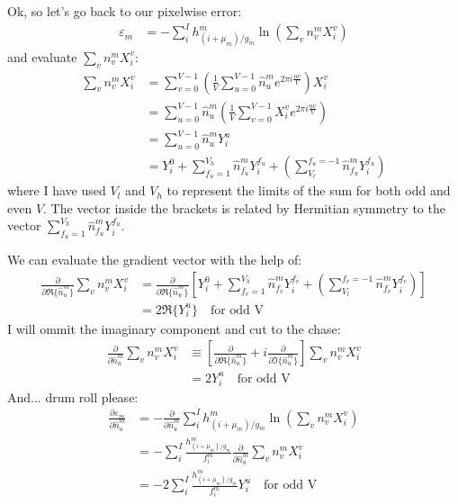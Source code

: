 \documentclass[11pt]{article}
\begin{document}
Ok, so let's go back to our pixelwise error:
\begin{align}
   \varepsilon_m &= - \sum_i^I h^m_{(i+\mu_m)/g_m} \ln\left(\sum_v n^m_v X^v_i\right)
\end{align}
and evaluate $\sum_v n^m_v X^v_i$:
\begin{align}
   \sum_v n^m_v X^v_i &= \sum_{v=0}^{V-1} \left( \frac{1}{V} \sum_{u=0}^{V-1} \hat{n}^m_u e^{2\pi i \frac{u v}{V}} \right) X^v_i \\
   &= \sum_{u=0}^{V-1} \hat{n}^m_u  \left( \frac{1}{V}  \sum_{v=0}^{V-1}  X^v_i e^{2\pi i \frac{u v}{V}}\right) \\
   &= \sum_{u=0}^{V-1} \hat{n}^m_u  Y^u_i \\
   &= Y^0_i + \sum_{f_u=1}^{V_h} \hat{n}^m_{f_u} Y^{f_u}_i + \left(\sum_{V_l}^{f_u=-1} \hat{n}^m_{f_u} Y^{f_u}_i\right) 
\end{align}
where I have used $V_l$ and $V_h$ to represent the limits of the sum for both odd and even $V$. The vector inside the brackets is related by Hermitian symmetry to the vector $\sum_{f_u=1}^{V_h} \hat{n}^m_{f_u} Y^{f_u}_i$.

We can evaluate the gradient vector with the help of:
\begin{align*}
   \frac{\partial}{\partial \Re\{ \hat{n}^m_u \}} \sum_v n^m_v X^v_i &= \frac{\partial}{\partial \Re\{ \hat{n}^m_u \}}\left[Y^0_i + \sum_{f_v=1}^{V_h} \hat{n}^m_{f_v} Y^{f_v}_i + \left(\sum_{V_l}^{f_v=-1} \hat{n}^m_{f_v} Y^{f_v}_i\right) \right] \\
   &= 2 \Re\{Y^{u}_i\} \quad \text{for odd V} 
\end{align*}
I will ommit the imaginary component and cut to the chase:
\begin{align*}
   \frac{\partial}{\partial \hat{n}^m_u} \sum_v n^m_v X^v_i &\equiv \left[\frac{\partial}{\partial \Re\{ \hat{n}^m_u \}} + i \frac{\partial}{\partial \Im\{ \hat{n}^m_u \}}\right]  \sum_v n^m_v X^v_i \\
   &= 2 Y^{u}_i \quad \text{for odd V} 
\end{align*}
And... drum roll please:
\begin{align*}
   \frac{\partial \varepsilon_m}{\partial \hat{n}^m_u}  &= -\frac{\partial}{\partial \hat{n}^m_u} \sum_i^I h^m_{(i+\mu_m)/g_m} \ln\left(\sum_v n^m_v X^v_i\right) \\
   &= - \sum_i^I \frac{h^m_{(i+\mu_m)/g_m}}{f^m_i} \frac{\partial}{\partial \hat{n}^m_u} \sum_v n^m_v X^v_i \\
   &= - 2 \sum_i^I \frac{h^m_{(i+\mu_m)/g_m}}{f^m_i} Y^{u}_i \quad \text{for odd V} 
\end{align*}
\end{document}
